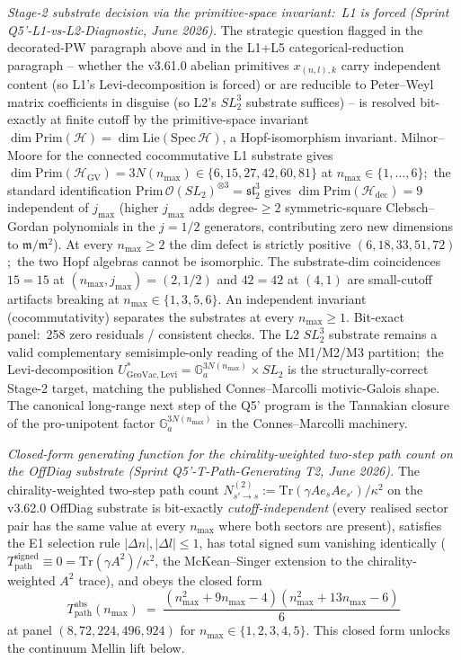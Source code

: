 \documentclass[11pt,a4paper]{article}
\theoremstyle{plain}
\theoremstyle{definition}
\begin{document}
\emph{Stage-2 substrate decision via the primitive-space invariant:\
L1 is forced (Sprint Q5'-L1-vs-L2-Diagnostic, June 2026).}  The
strategic question flagged in the decorated-PW paragraph above and in
the L1+L5 categorical-reduction paragraph -- whether the v3.61.0
abelian primitives $x_{(n, l), k}$ carry independent content (so L1's
Levi-decomposition is forced) or are reducible to Peter--Weyl matrix
coefficients in disguise (so L2's $SL_2^3$ substrate suffices) -- is
resolved bit-exactly at finite cutoff by the primitive-space invariant
$\dim \mathrm{Prim}(\mathcal{H}) = \dim \mathrm{Lie}(\mathrm{Spec}\,\mathcal{H})$,
a Hopf-isomorphism invariant.  Milnor--Moore for the connected
cocommutative L1 substrate gives
$\dim \mathrm{Prim}(\mathcal{H}_{\mathrm{GV}}) = 3 N(n_{\max}) \in \{6, 15, 27, 42, 60, 81\}$
at $n_{\max} \in \{1, \dots, 6\}$;\ the standard identification
$\mathrm{Prim}\,\mathcal{O}(SL_2)^{\otimes 3} = \mathfrak{sl}_2^3$ gives
$\dim \mathrm{Prim}(\mathcal{H}_{\mathrm{dec}}) = 9$ independent of
$j_{\max}$ (higher $j_{\max}$ adds degree-$\ge 2$ symmetric-square
Clebsch--Gordan polynomials in the $j = 1/2$ generators, contributing
zero new dimensions to $\mathfrak{m}/\mathfrak{m}^2$).  At every
$n_{\max} \ge 2$ the dim defect is strictly positive $(6, 18, 33, 51, 72)$;\
the two Hopf algebras cannot be isomorphic.  The substrate-dim
coincidences $15 = 15$ at $(n_{\max}, j_{\max}) = (2, 1/2)$ and
$42 = 42$ at $(4, 1)$ are small-cutoff artifacts breaking at
$n_{\max} \in \{1, 3, 5, 6\}$.  An independent invariant
(cocommutativity) separates the substrates at every $n_{\max} \ge 1$.
Bit-exact panel:\ 258 zero residuals / consistent checks.  The L2
$SL_2^3$ substrate remains a valid complementary semisimple-only
reading of the M1/M2/M3 partition;\ the Levi-decomposition
$U^*_{\mathrm{GeoVac}, \mathrm{Levi}} = \mathbb{G}_a^{3 N(n_{\max})} \times SL_2$
is the structurally-correct Stage-2 target, matching the published
Connes--Marcolli motivic-Galois shape.  The canonical long-range next
step of the Q5' program is the Tannakian closure of the pro-unipotent
factor $\mathbb{G}_a^{3 N(n_{\max})}$ in the Connes--Marcolli machinery.

\emph{Closed-form generating function for the chirality-weighted
two-step path count on the OffDiag substrate (Sprint Q5'-T-Path-Generating
T2, June 2026).}  The
chirality-weighted two-step path count
$N^{(2)}_{s' \to s} := \mathrm{Tr}(\gamma A e_s A e_{s'})/\kappa^2$
on the v3.62.0 OffDiag substrate is bit-exactly \emph{cutoff-independent}
(every realised sector pair has the same value at every $n_{\max}$
where both sectors are present), satisfies the E1 selection rule
$|\Delta n|, |\Delta l| \le 1$, has total signed sum vanishing identically
($T_{\mathrm{path}}^{\mathrm{signed}} \equiv 0 = \mathrm{Tr}(\gamma A^2)/\kappa^2$,
the McKean--Singer extension to the chirality-weighted $A^2$ trace), and
obeys the closed form
\[
T_{\mathrm{path}}^{\mathrm{abs}}(n_{\max}) \;=\;
\frac{(n_{\max}^2 + 9 n_{\max} - 4)(n_{\max}^2 + 13 n_{\max} - 6)}{6}
\]
at panel $(8, 72, 224, 496, 924)$ for $n_{\max} \in \{1, 2, 3, 4, 5\}$.
This closed form unlocks the continuum Mellin lift below.
\end{document}
